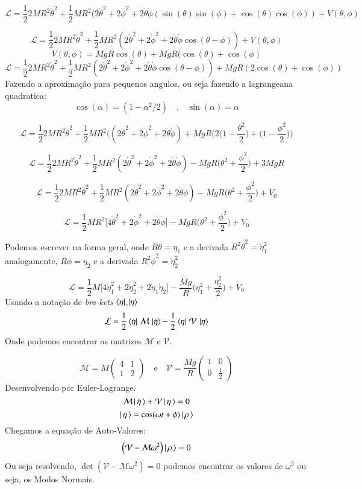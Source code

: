 \documentclass[a4paper,11pt]{exam}
\begin{document}
	\[\mathcal{L} = \frac{1}{2} 2MR^2\dot\theta^2 + \frac{1}{2} MR^2(2\dot\theta^2+2\dot\phi^2 +2\dot\theta\dot\phi (\sin(\theta)\sin(\phi) +\cos(\theta)\cos(\phi)) + V(\theta,\phi)\]
	
	\[\mathcal{L} = \frac{1}{2} 2MR^2\dot\theta^2 + \frac{1}{2} MR^2(2\dot\theta^2+2\dot\phi^2 +2\dot\theta\dot\phi \cos(\theta - \phi)) + V(\theta,\phi)\]
	\[V(\theta,\phi) = MgR\cos(\theta) + MgR(\cos(\theta)+\cos(\phi)\]
	\[\mathcal{L} = \frac{1}{2} 2MR^2\dot\theta^2 + \frac{1}{2} MR^2(2\dot\theta^2+2\dot\phi^2 +2\dot\theta\dot\phi \cos(\theta - \phi)) + MgR(2\cos(\theta) +\cos(\phi) )\]
	Fazendo a aproximação para pequenos angulos, ou seja fazendo a lagrangeana quadratica:
	\[\cos(\alpha) = (1-\alpha^2/2) \quad \text{,} \quad \sin(\alpha) = \alpha\]
	
	\[\mathcal{L} = \frac{1}{2} 2MR^2\dot\theta^2 + \frac{1}{2} MR^2((2\dot\theta^2+2\dot\phi^2 +2\dot\theta\dot\phi ) + MgR\Bigg(2\Big(1-\frac{\theta^2}{2}\Big) +\Big(1-\frac{\phi^2}{2}\Big)\Bigg)\]
	
	\[\mathcal{L} = \frac{1}{2} 2MR^2\dot\theta^2 + \frac{1}{2} MR^2(2\dot\theta^2+2\dot\phi^2 +2\dot\theta\dot\phi ) - MgR\Bigg(\theta^2 +\frac{\phi^2}{2}\Bigg) + 3MgR\]
	
	\[\mathcal{L} = \frac{1}{2} 2MR^2\dot\theta^2 + \frac{1}{2} MR^2(2\dot\theta^2+2\dot\phi^2 +2\dot\theta\dot\phi ) - MgR\Bigg(\theta^2 +\frac{\phi^2}{2}\Bigg) + V_0\]
	
	
	\[\mathcal{L} = \frac{1}{2} MR^2\Bigg[4\dot\theta^2+2\dot\phi^2 +2\dot\theta\dot\phi \Bigg] - MgR\Bigg(\theta^2 +\frac{\phi^2}{2}\Bigg) + V_0\]
	
	
	Podemos escrever na forma geral, onde $R\theta = \eta_1$ e a derivada $R^2\dot\theta^2 = \dot\eta_1^2$ analogamente, $R\phi = \eta_2$ e a derivada $R^2\dot\phi^2 = \dot\eta_2^2$
	
	\[\mathcal{L} = \frac{1}{2} M\Bigg[4\dot\eta_1^2+2\dot\eta_2^2 +2\dot\eta_1\dot\eta_2 \Bigg] - \frac{Mg}{R}\Bigg(\eta_1^2 +\frac{\eta_2^2}{2}\Bigg) + V_0\]
	Usando a notação de \emph{bra-kets} $\bra{\eta}$,$\ket{\eta}$
	\[\mathcal{L} = \frac{1}{2}\Bra{\dot\eta}\, \mathcal{M} \,\Ket{\dot\eta} - \frac{1}{2}\Bra{\eta}\, \mathcal{V} \,\Ket{\eta}\]
	Onde podemos encontrar as matrizes $\mathcal{M}$ e $\mathcal{V}$.
	
	\[ \mathcal{M} = M\begin{pmatrix}
		4 & 1 \\
		1 & 2
		\end{pmatrix}
		\quad
		\text{e}
		\quad
	\mathcal{V} = \frac{Mg}{R}
		\begin{pmatrix}
			1 & 0 \\
			0 & \frac{1}{2}
		\end{pmatrix}
	\]
	Desenvolvendo por Euler-Lagrange.
	\[ \mathcal{M}\ket{\,\ddot\eta \,} + \mathcal{V}\ket{\,\eta\,} = 0\]
	\[\ket{\,\eta\,} = \cos(\omega t + \phi)\ket{\,\rho\,}\]
	Chegamos a equação de Auto-Valores:
	\[ \Big( \mathcal{V} - \mathcal{M}\omega^2 \Big)\ket{\,\rho\,} = 0 \]
	Ou seja resolvendo, $\det(\mathcal{V} - \mathcal{M}\omega^2 )=0$ podemos encontrar os valores de $\omega^2$ ou seja, os Modos Normais.
	
\end{document}
